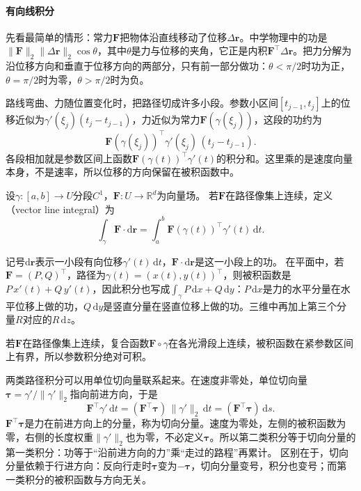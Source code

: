 \paragraph{有向线积分}

先看最简单的情形：常力$\bm F$把物体沿直线移动了位移$\Delta\bm r$。中学物理中的功是$\lVert\bm F\rVert_2\lVert\Delta\bm r\rVert_2\cos\theta$，其中$\theta$是力与位移的夹角，它正是内积$\bm F^\top\Delta\bm r$。把力分解为沿位移方向和垂直于位移方向的两部分，只有前一部分做功：$\theta<\pi/2$时功为正，$\theta=\pi/2$时为零，$\theta>\pi/2$时为负。

路线弯曲、力随位置变化时，把路径切成许多小段。参数小区间$[t_{j-1},t_j]$上的位移近似为$\gamma'(\xi_j)(t_j-t_{j-1})$，力近似为常力$\bm F(\gamma(\xi_j))$，这段的功约为
\[
 \bm F(\gamma(\xi_j))^\top\gamma'(\xi_j)\,(t_j-t_{j-1}).
\]
各段相加就是参数区间上函数$\bm F(\gamma(t))^\top\gamma'(t)$的积分和。这里乘的是速度向量本身，不是速率，所以位移的方向保留在被积函数中。
\begin{definition}[第二类路径积分]
设$\gamma:[a,b]\to U$分段$C^1$，$\bm F:U\to\mathbb R^d$为向量场。
若$\bm F$在路径像集上连续，定义（vector line integral）为
\begin{equation}
 \int_\gamma\bm F\mathbin{\cdot}\mathrm d\bm r
 =\int_a^b\bm F(\gamma(t))^\top\gamma'(t)\,\mathrm dt.
 \label{eq:analysis-vector-line-integral}
\end{equation}
\end{definition}

记号$\mathrm d\bm r$表示一小段有向位移$\gamma'(t)\,\mathrm dt$，$\bm F\cdot\mathrm d\bm r$是这一小段上的功。
在平面中，若$\bm F=(P,Q)^\top$，路径为$\gamma(t)=(x(t),y(t))^\top$，则被积函数是$P\,x'(t)+Q\,y'(t)$，因此积分也写成$\int_\gamma P\,\mathrm dx+Q\,\mathrm dy$：$P\,\mathrm dx$是力的水平分量在水平位移上做的功，$Q\,\mathrm dy$是竖直分量在竖直位移上做的功。三维中再加上第三个分量$R$对应的$R\,\mathrm dz$。

若$\bm F$在路径像集上连续，复合函数$\bm F\circ\gamma$在各光滑段上连续，被积函数在紧参数区间上有界，所以参数积分绝对可积。

两类路径积分可以用单位切向量联系起来。在速度非零处，单位切向量$\bm\tau=\gamma'/\lVert\gamma'\rVert_2$指向前进方向，于是
\[
 \bm F^\top\gamma'\,\mathrm dt=(\bm F^\top\bm\tau)\,\lVert\gamma'\rVert_2\,\mathrm dt=(\bm F^\top\bm\tau)\,\mathrm ds.
\]
$\bm F^\top\bm\tau$是力在前进方向上的分量，称为切向分量。速度为零处，左侧的被积函数为零，右侧的长度权重$\lVert\gamma'\rVert_2$也为零，不必定义$\bm\tau$。所以第二类积分等于切向分量的第一类积分：功等于“沿前进方向的力”乘“走过的路程”再累计。
区别在于，切向分量依赖于行进方向：反向行走时$\bm\tau$变为$-\bm\tau$，切向分量变号，积分也变号；而第一类积分的被积函数与方向无关。

